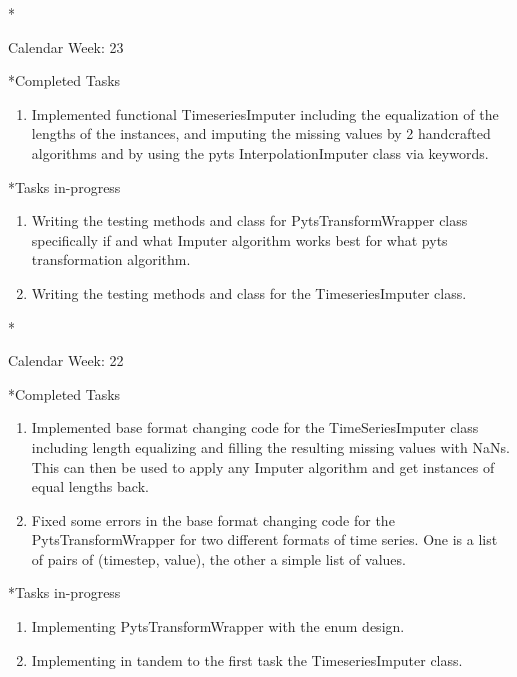 \documentclass[11pt,a4paper]{article}
\begin{document}
\newpage
\begin{section}*{Calendar Week: 23 \hfill \date{11 June, 2021}}
	
	\begin{subsection}*{Completed Tasks}
		\begin{enumerate}
			\item Implemented functional TimeseriesImputer including the equalization of the lengths of the instances, and imputing the missing values by 2 handcrafted algorithms and by using the pyts InterpolationImputer class via keywords.
		\end{enumerate}
	\end{subsection}
	
	\begin{subsection}*{Tasks in-progress}
		\begin{enumerate}
			\item Writing the testing methods and class for PytsTransformWrapper class specifically if and what Imputer algorithm works best for what pyts transformation algorithm.
			\item Writing the testing methods and class for the TimeseriesImputer class.
		\end{enumerate}
	\end{subsection}
	
\end{section}

\newpage
\begin{section}*{Calendar Week: 22 \hfill \date{04 June, 2021}}
	
	\begin{subsection}*{Completed Tasks}
		\begin{enumerate}
			\item Implemented base format changing code for the TimeSeriesImputer class including length equalizing and filling the resulting missing values with NaNs. This can then be used to apply any Imputer algorithm and get instances of equal lengths back.
			\item Fixed some errors in the base format changing code for the PytsTransformWrapper for two different formats of time series. One is a list of pairs of (timestep, value), the other a simple list of values.
		\end{enumerate}
	\end{subsection}

	\begin{subsection}*{Tasks in-progress}
		\begin{enumerate}
			\item Implementing PytsTransformWrapper with the enum design.
			\item Implementing in tandem to the first task the TimeseriesImputer class.
		\end{enumerate}
	\end{subsection}
	
\end{section}
\end{document}

